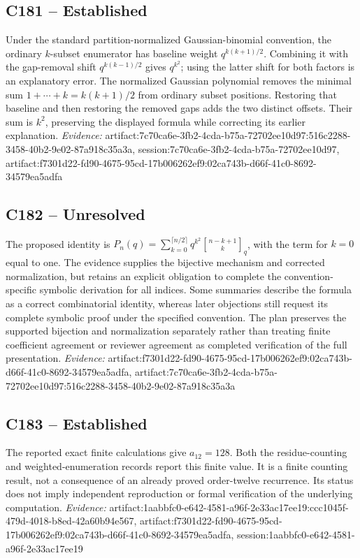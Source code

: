\documentclass[11pt]{article}
\begin{document}
\subsection{C181 -- Established}
Under the standard partition-normalized Gaussian-binomial convention, the ordinary $k$-subset enumerator has baseline weight $q^{k(k+1)/2}$. Combining it with the gap-removal shift $q^{k(k-1)/2}$ gives $q^{k^2}$; using the latter shift for both factors is an explanatory error.
The normalized Gaussian polynomial removes the minimal sum $1+\cdots+k=k(k+1)/2$ from ordinary subset positions. Restoring that baseline and then restoring the removed gaps adds the two distinct offsets. Their sum is $k^2$, preserving the displayed formula while correcting its earlier explanation.
\textit{Evidence: }artifact:7c70ca6e-3fb2-4cda-b75a-72702ee10d97:516c2288-3458-40b2-9e02-87a918c35a3a, session:7c70ca6e-3fb2-4cda-b75a-72702ee10d97, artifact:f7301d22-fd90-4675-95cd-17b006262ef9:02ca743b-d66f-41c0-8692-34579ea5adfa
\subsection{C182 -- Unresolved}
The proposed identity is $P_n(q)=\sum_{k=0}^{\lceil n/2\rceil}q^{k^2}\genfrac{[}{]}{0pt}{}{n-k+1}{k}_q$, with the term for $k=0$ equal to one. The evidence supplies the bijective mechanism and corrected normalization, but retains an explicit obligation to complete the convention-specific symbolic derivation for all indices.
Some summaries describe the formula as a correct combinatorial identity, whereas later objections still request its complete symbolic proof under the specified convention. The plan preserves the supported bijection and normalization separately rather than treating finite coefficient agreement or reviewer agreement as completed verification of the full presentation.
\textit{Evidence: }artifact:f7301d22-fd90-4675-95cd-17b006262ef9:02ca743b-d66f-41c0-8692-34579ea5adfa, artifact:7c70ca6e-3fb2-4cda-b75a-72702ee10d97:516c2288-3458-40b2-9e02-87a918c35a3a
\subsection{C183 -- Established}
The reported exact finite calculations give $a_{12}=128$.
Both the residue-counting and weighted-enumeration records report this finite value. It is a finite counting result, not a consequence of an already proved order-twelve recurrence. Its status does not imply independent reproduction or formal verification of the underlying computation.
\textit{Evidence: }artifact:1aabbfc0-e642-4581-a96f-2e33ac17ee19:ccc1045f-479d-4018-b8ed-42a60b94e567, artifact:f7301d22-fd90-4675-95cd-17b006262ef9:02ca743b-d66f-41c0-8692-34579ea5adfa, session:1aabbfc0-e642-4581-a96f-2e33ac17ee19
\end{document}
